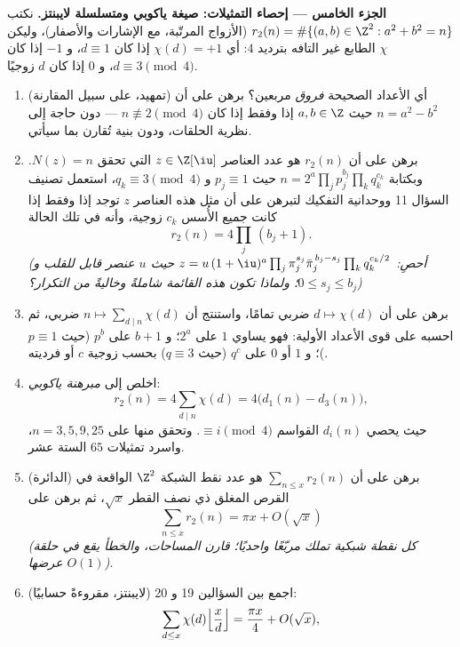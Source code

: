 \begin{problem}
\medskip
\noindent\textbf{الجزء الخامس --- إحصاء التمثيلات: صيغة ياكوبي
ومتسلسلة لايبنتز.} نكتب $r_2(n) = \#\{(a, b) \in
\Z^2 : a^2 + b^2 = n\}$ (الأزواج المرتّبة، مع الإشارات
والأصفار)، وليكن $\chi$ الطابع غير التافه بترديد $4$: أي
$\chi(d) = +1$ إذا كان $d \equiv 1$، و $-1$ إذا كان $d \equiv 3 \pmod4$،
و $0$ إذا كان $d$ زوجيًا.
\begin{enumerate}[resume]
  \item (تمهيد، على سبيل المقارنة) أي الأعداد الصحيحة \emph{فروق}
        مربعين؟ برهن على أن $n = a^2 - b^2$ حيث $a, b \in \Z$
        إذا وفقط إذا كان $n \not\equiv 2 \pmod 4$ --- دون حاجة إلى نظرية الحلقات،
        ودون بنية تُقارن بما سيأتي.
  \item برهن على أن $r_2(n)$ هو عدد العناصر $z \in \Z[\iu]$ التي
        تحقق $N(z) = n$. وبكتابة $n = 2^{a}\prod_jp_j^{b_j}
        \prod_kq_k^{c_k}$ حيث $p_j \equiv 1$
        و $q_k \equiv 3
        \pmod4$، استعمل تصنيف السؤال 11 ووحدانية التفكيك
        لتبرهن على أن مثل هذه العناصر $z$ توجد إذا وفقط إذا كانت
        جميع الأُسس $c_k$ زوجية، وأنه في تلك الحالة
        \[
        r_2(n) = 4\prod_j\,(b_j + 1) .
        \]
        \emph{(أحصِ: $z = u\,(1+\iu)^{a}\prod_j\pi_j^{s_j}
        \bar\pi_j^{\,b_j - s_j}\prod_kq_k^{c_k/2}$ حيث $u$ عنصر قابل للقلب و $0 \leq s_j \leq b_j$؛
        ولماذا تكون هذه القائمة شاملةً وخاليةً من التكرار؟)}
  \item برهن على أن $d \mapsto \chi(d)$ ضربي تمامًا، واستنتج أن $n \mapsto
        \sum_{d \mid n}\chi(d)$
        ضربي، ثم احسبه على قوى الأعداد الأولية: فهو يساوي $1$ على
        $2^a$؛ و $b + 1$ على $p^b$ (حيث $p \equiv 1$)؛ و $1$ أو
        $0$ على $q^c$ (حيث $q \equiv 3$) بحسب زوجية $c$ أو
        فرديته.
  \item اخلص إلى \emph{مبرهنة ياكوبي}:
        \[
        r_2(n) = 4\sum_{d \mid n}\chi(d) =
        4\bigl(d_1(n) - d_3(n)\bigr),
        \]
        حيث يحصي $d_i(n)$ القواسم $\equiv i \pmod 4$. وتحقق منها على
        $n = 3, 5, 9, 25$، واسرد تمثيلات $65$ الستة عشر.
  \item (الدائرة) برهن على أن $\sum_{n \leq x}r_2(n)$ هو عدد نقط الشبكة $\Z^2$
        الواقعة في القرص المغلق ذي نصف القطر $\sqrt x$، ثم برهن
        على
        \[
        \sum_{n\leq x}r_2(n) = \pi x + O(\sqrt x)
        \]
        \emph{(كل نقطة شبكية تملك مربّعًا واحديًا؛ قارن
        المساحات، والخطأ يقع في حلقة عرضها $O(1)$)}.
  \item (لايبنتز، مقروءةً حسابيًا) اجمع بين السؤالين 19 و 20:
        \[
        \sum_{d \leq x}\chi(d)\Bigl\lfloor\frac
        xd\Bigr\rfloor = \frac{\pi x}4 + O(\sqrt x),
\]
\end{enumerate}
\end{problem}
